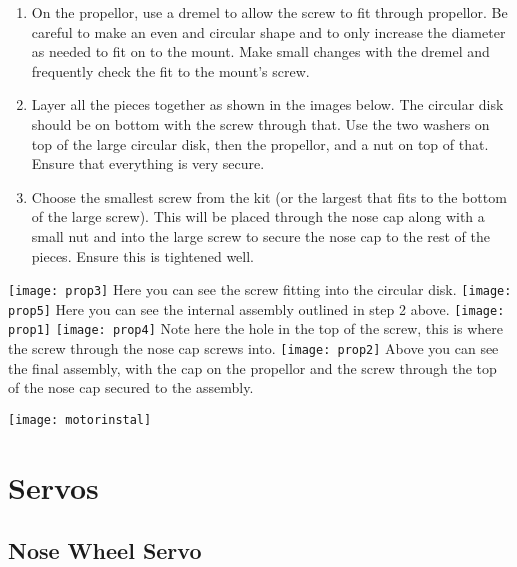 \documentclass{article}
\begin{document}
\begin{enumerate}

\item On the propellor, use a dremel to allow the screw to fit through propellor. Be careful to make an even and circular shape and to only increase the diameter as needed to fit on to the mount. Make small changes with the dremel and frequently check the fit to the mount's screw.
\item Layer all the pieces together as shown in the images below. The circular disk should be on bottom with the screw through that. Use the two washers on top of the large circular disk, then the propellor, and a nut on top of that. Ensure that everything is very secure. 
\item Choose the smallest screw from the kit (or the largest that fits to the bottom of the large screw). This will be placed through the nose cap along with a small nut and into the large screw to secure the nose cap to the rest of the pieces. Ensure this is tightened well.
\end{enumerate}


\begin{center}
\texttt{[image: prop3]} \newline
Here you can see the screw fitting into the circular disk. \newline
\texttt{[image: prop5]} \newline
Here you can see the internal assembly outlined in step 2 above. \newline
\texttt{[image: prop1]} \newline
\texttt{[image: prop4]} \newline
Note here the hole in the top of the screw, this is where the screw through the nose cap screws into. \newline
\texttt{[image: prop2]} \newline
Above you can see the final assembly, with the cap on the propellor and the screw through the top of the nose cap secured to the assembly. \newline

\texttt{[image: motorinstal]}
\end{center}

\clearpage
\section{Servos}

\subsection{Nose Wheel Servo}
\end{document}
